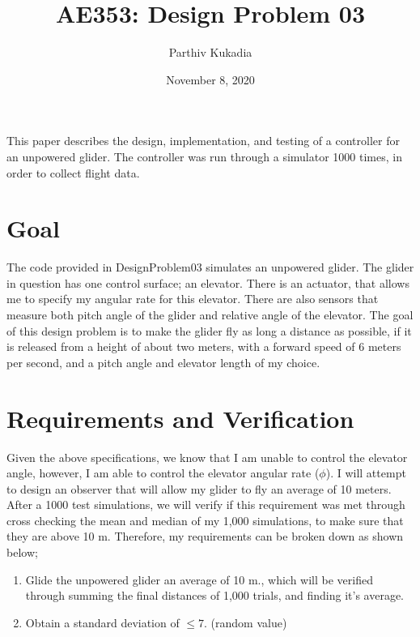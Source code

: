 \documentclass[12pt]{article}
\title{AE353: Design Problem 03}
\author{Parthiv Kukadia }
\date{November 8, 2020}
\begin{document}
\maketitle
This paper describes the design, implementation, and testing of a controller for an unpowered glider. The controller was run through a simulator 1000 times, in order to collect flight data.
\section{Goal}
The code provided in DesignProblem03 simulates an unpowered glider. The glider in question has one control surface; an elevator. There is an actuator, that allows me to specify my angular rate for this elevator. There are also sensors that measure both  pitch angle of the glider and relative angle of the elevator. The goal of this design problem is to make the glider fly as long a distance as possible, if it is released from a height of about two meters, with a forward speed of 6 meters per second, and a pitch angle and elevator length of my choice.
\section{Requirements and Verification}
Given the above specifications, we know that I am unable to control the elevator angle, however, I am able to control the elevator angular rate ($\phi$). I will attempt to design an observer that will allow my glider to fly an average of 10 meters. After a 1000 test simulations, we will verify if this requirement was met through cross checking the mean and median of my 1,000 simulations, to make sure that they are above 10 m. Therefore, my requirements can be broken down as shown below;\\
\begin{enumerate}
  \item Glide the unpowered glider an average of 10 m., which will be verified through summing the final distances of 1,000 trials, and finding it's average.
  \item Obtain a standard deviation of $\le 7$. (random value)
\end{enumerate}
\end{document}
